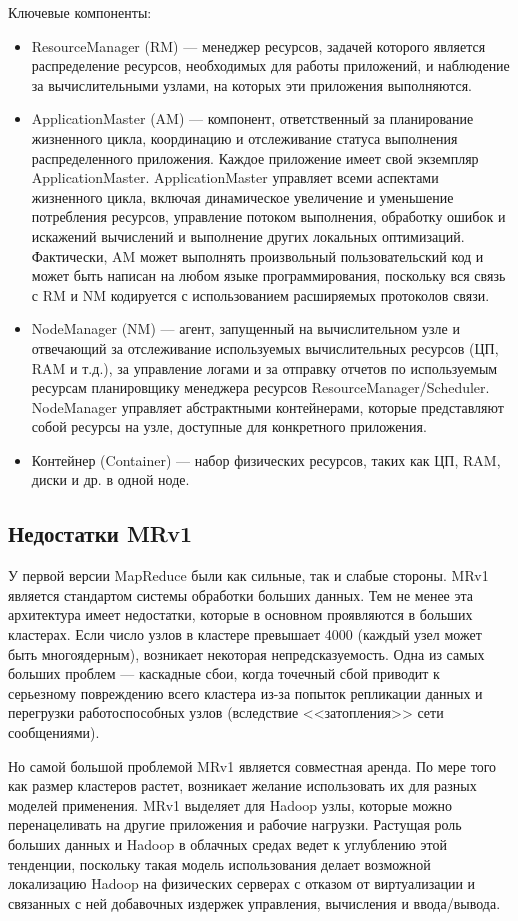 Ключевые компоненты:
\begin{itemize}
    \item ResourceManager (RM) --- менеджер ресурсов, задачей которого является распределение ресурсов, необходимых для работы приложений, и наблюдение за вычислительными узлами, на которых эти приложения выполняются.
    \item ApplicationMaster (AM) --- компонент, ответственный за планирование жизненного цикла, координацию и отслеживание статуса выполнения распределенного приложения. Каждое приложение имеет свой экземпляр ApplicationMaster. ApplicationMaster управляет всеми аспектами жизненного цикла, включая динамическое увеличение и уменьшение потребления ресурсов, управление потоком выполнения, обработку ошибок и искажений вычислений и выполнение других локальных оптимизаций. Фактически, AM может выполнять произвольный пользовательский код и может быть написан на любом языке программирования, поскольку вся связь с RM и NM кодируется с использованием расширяемых протоколов связи.
    \item NodeManager (NM) --- агент, запущенный на вычислительном узле и отвечающий за отслеживание используемых вычислительных ресурсов (ЦП, RAM и т.д.), за управление логами и за отправку отчетов по используемым ресурсам планировщику менеджера ресурсов ResourceManager/Scheduler. NodeManager управляет абстрактными контейнерами, которые представляют собой ресурсы на узле, доступные для конкретного приложения.
    \item Контейнер (Container) --- набор физических ресурсов, таких как ЦП, RAM, диски и др. в одной ноде.
\end{itemize}

\subsection{Недостатки MRv1}
У первой версии MapReduce были как сильные, так и слабые стороны. MRv1 является стандартом системы обработки больших данных. 
Тем не менее эта архитектура имеет недостатки, которые в основном проявляются в больших кластерах. Если число узлов в кластере превышает 4000 (каждый узел может быть многоядерным), возникает некоторая непредсказуемость. Одна из самых больших проблем --- каскадные сбои, когда точечный сбой приводит к серьезному повреждению всего кластера из-за попыток репликации данных и перегрузки работоспособных узлов (вследствие <<затопления>> сети сообщениями).

Но самой большой проблемой MRv1 является совместная аренда. По мере того как размер кластеров растет, возникает желание использовать их для разных моделей применения. MRv1 выделяет для Hadoop узлы, которые можно перенацеливать на другие приложения и рабочие нагрузки. Растущая роль больших данных и Hadoop в облачных средах ведет к углублению этой тенденции, поскольку такая модель использования делает возможной локализацию Hadoop на физических серверах с отказом от виртуализации и связанных с ней добавочных издержек управления, вычисления и ввода/вывода.

